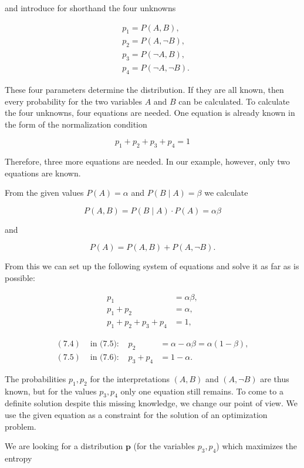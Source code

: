 \documentclass[10pt]{book}
\begin{document}
and introduce for shorthand the four unknowns

$$
\begin{aligned}
& p_{1}=P(A, B), \\
& p_{2}=P(A, \neg B), \\
& p_{3}=P(\neg A, B), \\
& p_{4}=P(\neg A, \neg B) .
\end{aligned}
$$

These four parameters determine the distribution. If they are all known, then every probability for the two variables $A$ and $B$ can be calculated. To calculate the four unknowns, four equations are needed. One equation is already known in the form of the normalization condition

$$
p_{1}+p_{2}+p_{3}+p_{4}=1
$$

Therefore, three more equations are needed. In our example, however, only two equations are known.

From the given values $P(A)=\alpha$ and $P(B \mid A)=\beta$ we calculate

$$
P(A, B)=P(B \mid A) \cdot P(A)=\alpha \beta
$$

and

$$
P(A)=P(A, B)+P(A, \neg B) .
$$

From this we can set up the following system of equations and solve it as far as is possible:

\begin{align*}
p_{1} & =\alpha \beta,  \tag{7.4}\\
p_{1}+p_{2} & =\alpha,  \tag{7.5}\\
p_{1}+p_{2}+p_{3}+p_{4} & =1, \tag{7.6}
\end{align*}

\begin{align*}
(7.4) & \text { in (7.5): } & p_{2} & =\alpha-\alpha \beta=\alpha(1-\beta),  \tag{7.7}\\
(7.5) & \text { in (7.6): } & p_{3}+p_{4} & =1-\alpha . \tag{7.8}
\end{align*}

The probabilities $p_{1}, p_{2}$ for the interpretations $(A, B)$ and $(A, \neg B)$ are thus known, but for the values $p_{3}, p_{4}$ only one equation still remains. To come to a definite solution despite this missing knowledge, we change our point of view. We use the given equation as a constraint for the solution of an optimization problem.

We are looking for a distribution $\boldsymbol{p}$ (for the variables $p_{3}, p_{4}$) which maximizes the entropy
\end{document}
